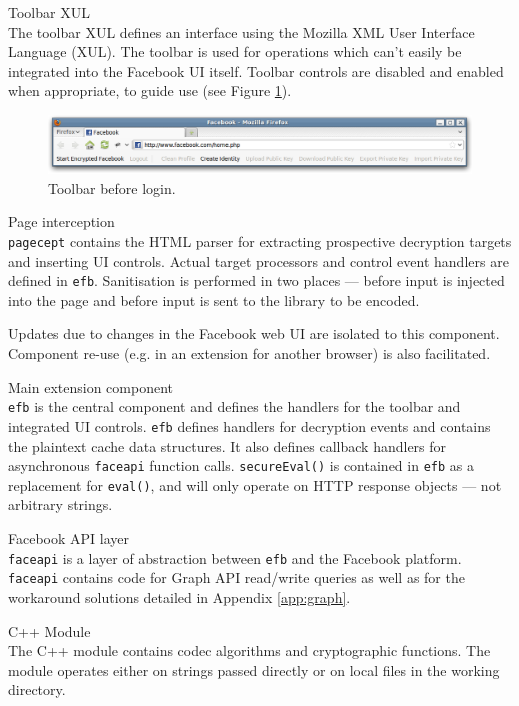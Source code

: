     \begin{sdesc}
     
    \item[Toolbar XUL] \hfill \\ The toolbar XUL defines an interface using the Mozilla XML User Interface Language (XUL). The toolbar is used for operations which can't easily be integrated into the Facebook UI itself. Toolbar controls are disabled and enabled when appropriate, to guide use (see Figure \ref{scn:toolbar}).
    
        \begin{figure}[tbph]
        \begin{center}
                \includegraphics[width=12cm]{screens/toolbar.png}
            \caption{Toolbar before login.}
            \label{scn:toolbar}
        \end{center}
    \end{figure}
    
    \item[Page interception] \hfill \\ {\tt pagecept} contains the HTML parser for extracting prospective decryption targets and inserting UI controls. Actual target processors and control event handlers are defined in {\tt efb}. Sanitisation is performed in two places --- before input is injected into the page and before input is sent to the library to be encoded.
    
    Updates due to changes in the Facebook web UI are isolated to this component. Component re-use (e.g. in an extension for another browser) is also facilitated. 

    \item[Main extension component] \hfill \\ {\tt efb} is the central component and defines the handlers for the toolbar and integrated UI controls. {\tt efb} defines handlers for decryption events and contains the plaintext cache data structures. It also defines callback handlers for asynchronous {\tt faceapi} function calls. {\tt secureEval()} is contained in {\tt efb} as a replacement for {\tt eval()}, and will only operate on HTTP response objects --- not arbitrary strings.
    
    \item[Facebook API layer] \hfill \\ {\tt faceapi} is a layer of abstraction between {\tt efb} and the Facebook platform. {\tt faceapi} contains code for Graph API read/write queries as well as for the workaround solutions detailed in Appendix \ref{app:graph}.

    \item[C++ Module] \hfill \\ The C++ module contains codec algorithms and cryptographic functions. The module operates either on strings passed directly or on local files in the working directory.
    
    \end{sdesc}
    

